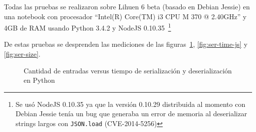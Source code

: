 Todas las pruebas se realizaron sobre Lihuen 6 beta (basado en Debian Jessie)
en una notebook con procesador ``Intel(R) Core(TM) i3 CPU M 370 @ 2.40GHz''
y 4GB de RAM %
usando Python 3.4.2 y NodeJS 0.10.35~\footnote{Se usó NodeJS 0.10.35 ya que
la versión 0.10.29 distribuida al momento con Debian Jessie tenía un bug que
generaba un error de memoria al
deserializar strings largos con \texttt{JSON.load} (CVE-2014-5256)}

De estas pruebas se desprenden las mediciones de las
figuras~\ref{fig:ser-time-py}, \ref{fig:ser-time-js} y \ref{fig:ser-size}.

\begin{figure}
    \centering
    \begin{framed}
    \end{framed}

    \caption{Cantidad de entradas versus tiempo de serialización y deserialización en Python}
    \label{fig:ser-time-py}
\end{figure}

